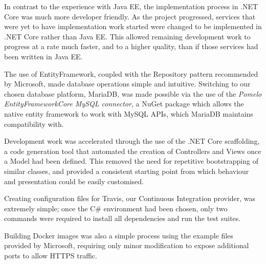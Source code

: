 In contrast to the experience with Java EE, the implementation process in .NET Core was much more developer friendly. As the project progressed, services that were yet to have implementation work started were changed to be implemented in .NET Core rather than Java EE. This allowed remaining development work to progress at a rate much faster, and to a higher quality, than if those services had been written in Java EE.

The use of EntityFramework, coupled with the Repository pattern\cite{dotnet_repository_pattern} recommended by Microsoft, made database operations simple and intuitive. Switching to our chosen database platform, MariaDB, was made possible via the use of the \textit{Pomelo EntityFrameworkCore MySQL connector}\cite{Pomelo}, a NuGet package which allows the native entity framework to work with MySQL APIs, which MariaDB maintains compatibility with.

Development work was accelerated through the use of the .NET Core scaffolding, a code generation tool that automated the creation of Controllers and Views once a Model had been defined. This removed the need for repetitive bootstrapping of similar classes, and provided a consistent starting point from which behaviour and presentation could be easily customised.

Creating configuration files for Travis, our Continuous Integration provider, was extremely simple; once the C\# environment had been chosen, only two commands were required to install all dependencies and run the test suites.

Building Docker images was also a simple process using the example files provided by Microsoft\cite{dotnet_docker}, requiring only minor modification to expose additional ports to allow HTTPS traffic.
